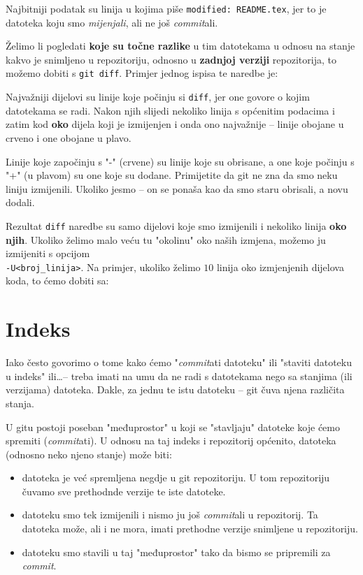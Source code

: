

Najbitniji podatak su linija u kojima piše \verb+modified: README.tex+, jer to je datoteka koju smo \emph{mijenjali}, ali ne još \emph{commit}ali.

Želimo li pogledati \textbf{koje su točne razlike} u tim datotekama u odnosu na stanje kakvo je snimljeno u repozitoriju, odnosno u \textbf{zadnjoj verziji} repozitorija, to možemo dobiti s \verb+git diff+. 
Primjer jednog ispisa te naredbe je:



Najvažniji dijelovi su linije koje počinju si \verb+diff+, jer one govore o kojim datotekama se radi.
Nakon njih slijedi nekoliko linija s općenitim podacima i zatim kod \textbf{oko} dijela koji je izmijenjen i onda ono najvažnije -- linije obojane u crveno i one obojane u plavo.

Linije koje započinju s "-" (crvene) su linije koje su obrisane, a one koje počinju s "+" (u plavom) su one koje su dodane. 
Primijetite da git ne zna da smo neku liniju izmijenili. 
Ukoliko jesmo -- on se ponaša kao da smo staru obrisali, a novu dodali.

Rezultat \verb+diff+ naredbe su samo dijelovi koje smo izmijenili i nekoliko linija \textbf{oko njih}.
Ukoliko želimo malo veću tu "okolinu" oko naših izmjena, možemo ju izmijeniti s opcijom \\ \verb+-U<broj_linija>+.
Na primjer, ukoliko želimo $10$ linija oko izmjenjenih dijelova koda, to ćemo dobiti sa:


\section*{Indeks}

Iako često govorimo o tome kako ćemo "\emph{commit}ati datoteku" ili "staviti datoteku u indeks" ili\dots -- treba imati na umu da ne radi s datotekama nego sa stanjima (ili verzijama) datoteka.
Dakle, za jednu te istu datoteku -- git čuva njena različita stanja.

U gitu postoji poseban "međuprostor" u koji se "stavljaju" datoteke koje ćemo spremiti (\emph{commit}ati).
U odnosu na taj indeks i repozitorij općenito, datoteka (odnosno neko njeno stanje) može biti:

\begin{itemize}
	\item datoteka je već spremljena negdje u git repozitoriju. U tom repozitoriju čuvamo sve prethodnde verzije te iste datoteke.
	\item datoteku smo tek izmijenili i nismo ju još \emph{commit}ali u repozitorij. Ta datoteka može, ali i ne mora, imati prethodne verzije snimljene u repozitoriju.
	\item datoteku smo stavili u taj "međuprostor" tako da bismo se pripremili za \emph{commit}.
\end{itemize}

